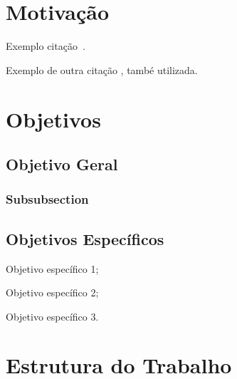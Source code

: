 \section{Motivação}
\label{sec:motivacao}

Exemplo citação~\cite{lamport1986latex}.

Exemplo de outra citação , també utilizada.

\section{Objetivos}
\label{sec:objetivos}

\subsection{Objetivo Geral}
\label{subsec:objetivo-geral}

\subsubsection{Subsubsection}
\label{subsubsec:subsubsection}

\subsection{Objetivos Específicos}
\label{subsec:objetivos-especificos}
	\begin{alineas}
	    \item Objetivo específico 1;
		\item Objetivo específico 2;
		\item Objetivo específico 3.
	\end{alineas}

\section{Estrutura do Trabalho}
\label{sec:estrutura-do-trabalho}